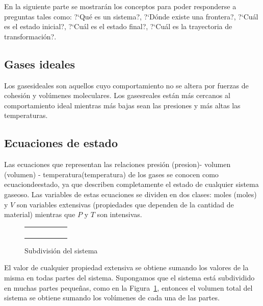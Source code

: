 En la siguiente parte se mostrar\'an los conceptos para poder responderse a preguntas tales como: ?`Qu\'e es un sistema?, ?`D\'onde existe una frontera?, ?`Cu\'al es el estado inicial?, ?`Cu\'al es el estado final?, ?`Cu\'al es la trayectoria de transformaci\'on?.


\subsection{Gases ideales} 
Los \gls{gasesideales} son aquellos cuyo comportamiento no se
altera por fuerzas de cohesi\'on y vol\'umenes moleculares. Los \gls{gasesreales}
est\'an m\'as cercanos al comportamiento ideal mientras m\'as bajas sean las
presiones y m\'as altas las temperaturas.

\subsection{Ecuaciones de estado}

Las ecuaciones  que representan las relaciones presi\'on
(\gls{presion})- volumen (\gls{volumen}) -
temperatura(\gls{temperatura}) de los gases se conocen como \gls{ecuaciondeestado}, ya que describen completamente el estado de cualquier
sistema gaseoso. Las variables de estas ecuaciones se dividen en dos clases:
moles (\gls{moles}) y $V$ son variables extensivas (propiedades que dependen de la
cantidad de material) mientras que $P$ y $T$ son intensivas.

\begin{figure}[ht]

\begin{center}
\begin{tabular}{||c|c|c|c|c|c||} \hline \hline
      &           &          &           &  & \\ \hline
      &           &          &           &  & \\ \hline
      &           &          &           &  & \\ \hline
      &           &          &           &  & \\ \hline
      &           &          &           &  &  \\ \hline \hline
\end{tabular}
\caption{Subdivisi\'on del sistema}
\label{fig:1}
\end{center}
\end{figure}


El valor de cualquier propiedad extensiva se obtiene sumando
los va\-lores de la misma en todas partes del sistema. Supongamos que el sistema est\'a
subdividido en muchas partes peque\~nas, como en la Figura~\ref{fig:1}, entonces el volumen total del sistema se obtiene sumando los vol\'umenes de
cada una de las partes.

